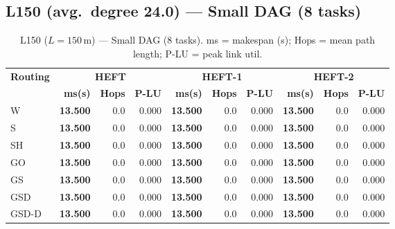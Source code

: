 \documentclass[11pt]{article}
\newcommand{\win}[1]{\textcolor{green!50!black}{\textbf{#1}}}
\begin{document}
\subsection{L150 (avg.\ degree 24.0) --- Small DAG (8 tasks)}
\begin{table}[H]
\centering\small
\begin{tabular}{l r r r r r r r r r}
\toprule
\textbf{Routing} & \multicolumn{3}{c}{\textbf{HEFT}} & \multicolumn{3}{c}{\textbf{HEFT-1}} & \multicolumn{3}{c}{\textbf{HEFT-2}} \\
\cmidrule(lr){2-4}\cmidrule(lr){5-7}\cmidrule(lr){8-10}
& \textbf{ms(s)} & \textbf{Hops} & \textbf{P-LU} & \textbf{ms(s)} & \textbf{Hops} & \textbf{P-LU} & \textbf{ms(s)} & \textbf{Hops} & \textbf{P-LU} \\
\midrule
  W & \win{13.500} & 0.0 & 0.000 & \win{13.500} & 0.0 & 0.000 & \win{13.500} & 0.0 & 0.000 \\
  S & \win{13.500} & 0.0 & 0.000 & \win{13.500} & 0.0 & 0.000 & \win{13.500} & 0.0 & 0.000 \\
  SH & \win{13.500} & 0.0 & 0.000 & \win{13.500} & 0.0 & 0.000 & \win{13.500} & 0.0 & 0.000 \\
  GO & \win{13.500} & 0.0 & 0.000 & \win{13.500} & 0.0 & 0.000 & \win{13.500} & 0.0 & 0.000 \\
  GS & \win{13.500} & 0.0 & 0.000 & \win{13.500} & 0.0 & 0.000 & \win{13.500} & 0.0 & 0.000 \\
  GSD & \win{13.500} & 0.0 & 0.000 & \win{13.500} & 0.0 & 0.000 & \win{13.500} & 0.0 & 0.000 \\
  GSD-D & \win{13.500} & 0.0 & 0.000 & \win{13.500} & 0.0 & 0.000 & \win{13.500} & 0.0 & 0.000 \\
\bottomrule
\end{tabular}
\caption{L150 ($L=150$\,m) --- Small DAG (8 tasks). ms = makespan (s); Hops = mean path length; P-LU = peak link util.}
\end{table}
\end{document}
